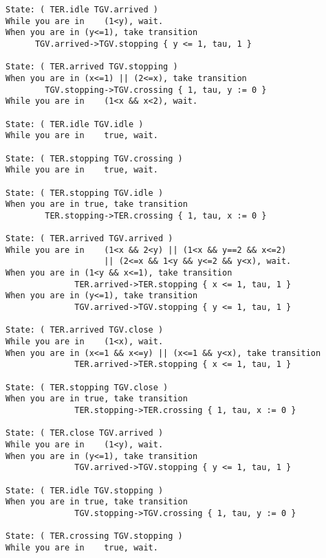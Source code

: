 \documentclass{article}
\begin{document}
\begin{verbatim}
State: ( TER.idle TGV.arrived ) 
While you are in	(1<y), wait.
When you are in (y<=1), take transition 
      TGV.arrived->TGV.stopping { y <= 1, tau, 1 }

State: ( TER.arrived TGV.stopping ) 
When you are in (x<=1) || (2<=x), take transition 
        TGV.stopping->TGV.crossing { 1, tau, y := 0 }
While you are in	(1<x && x<2), wait.

State: ( TER.idle TGV.idle ) 
While you are in	true, wait.

State: ( TER.stopping TGV.crossing ) 
While you are in	true, wait.

State: ( TER.stopping TGV.idle ) 
When you are in true, take transition 
        TER.stopping->TER.crossing { 1, tau, x := 0 }

State: ( TER.arrived TGV.arrived ) 
While you are in	(1<x && 2<y) || (1<x && y==2 && x<=2) 
                    || (2<=x && 1<y && y<=2 && y<x), wait.
When you are in (1<y && x<=1), take transition 
              TER.arrived->TER.stopping { x <= 1, tau, 1 }
When you are in (y<=1), take transition 
              TGV.arrived->TGV.stopping { y <= 1, tau, 1 }

State: ( TER.arrived TGV.close ) 
While you are in	(1<x), wait.
When you are in (x<=1 && x<=y) || (x<=1 && y<x), take transition 
              TER.arrived->TER.stopping { x <= 1, tau, 1 }

State: ( TER.stopping TGV.close ) 
When you are in true, take transition 
              TER.stopping->TER.crossing { 1, tau, x := 0 }

State: ( TER.close TGV.arrived ) 
While you are in	(1<y), wait.
When you are in (y<=1), take transition 
              TGV.arrived->TGV.stopping { y <= 1, tau, 1 }

State: ( TER.idle TGV.stopping ) 
When you are in true, take transition 
              TGV.stopping->TGV.crossing { 1, tau, y := 0 }

State: ( TER.crossing TGV.stopping ) 
While you are in	true, wait.

\end{verbatim}
\end{document}
